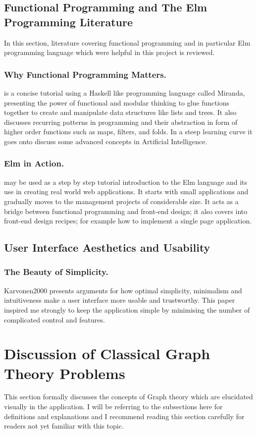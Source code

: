 \subsection{Functional Programming and The Elm Programming Literature}
In this section, literature covering functional programming and in particular
Elm programming language which were helpful in this project is reviewed.

\subsubsection{Why Functional Programming Matters.}
\cite{Hughes89} is a concise tutorial using a Haskell like programming language called
Miranda, presenting the power of functional and modular thinking to glue
functions together to create and manipulate data structures like lists and
trees. It also discusses recurring patterns in programming and their
abstraction in form of higher order functions such as maps, filters, and folds. In a steep learning curve it goes onto discuss some advanced concepts
in Artificial Intelligence.

\subsubsection{Elm in Action.}
\cite{feldman2020elm} may be used as a step by step tutorial introduction to the Elm
language and its use in creating real world web applications. It starts with
small applications and gradually moves to the management projects of
considerable size. It acts as a bridge between functional programming and
front-end design; it also covers into front-end design recipes; for example how
to implement a single page application.

\subsection{User Interface Aesthetics and Usability}
\subsubsection{The Beauty of Simplicity.}
{Karvonen2000} presents arguments for how optimal simplicity, minimalism and
intuitiveness make a user interface more usable and trustworthy. This paper inspired me strongly to keep the application simple by minimising the number of complicated
control and features.

\section{Discussion of Classical Graph Theory Problems}
This section formally discusses the concepts of Graph theory which are
elucidated visually in the application.  I will be referring to the subsections here for definitions and explanations and I recommend reading this section carefully for readers not yet familiar with this topic.


